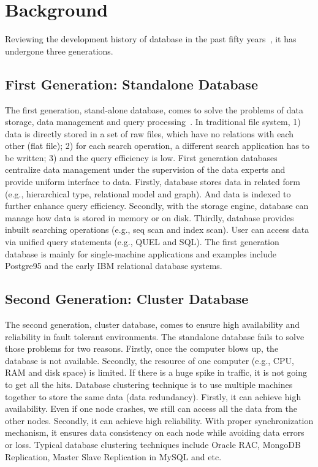 
\vspace{-.5em}
\section{Background}
\label{sec:background}
\vspace{-.25em}
Reviewing the development history of database in the past fifty years~\cite{Ramakrishnan:2002:DMS:560733}, it has undergone three generations.

\subsection{First Generation: Standalone Database}
The first generation, stand-alone database, comes to solve the problems of data storage, data management and query processing~\cite{DBLP:books/daglib/0006734}. In traditional file system, 1) data is directly stored in a set of raw files, which have no relations with each other (flat file); 2) for each search operation, a different search application has to be written; 3) and the query efficiency is low. First generation databases centralize data management under the supervision of the data experts and provide uniform interface to data. 
Firstly, database stores data in related form (e.g., hierarchical type, relational model and graph). And data is indexed to further enhance query efficiency. Secondly, with the storage engine, database can manage how data is stored in memory or on disk. Thirdly, database provides inbuilt searching operations (e.g., seq scan and index scan). User can access data via unified query statements (e.g., QUEL and SQL). The first generation database is mainly for single-machine applications and examples include Postgre95 and the early IBM relational database systems. 

\subsection{Second Generation: Cluster Database}
The second generation, cluster database, comes to ensure high availability and reliability in fault tolerant environments. The standalone database fails to solve those problems for two reasons. Firstly, once the computer blows up, the database is not available. Secondly, the resource of one computer (e.g., CPU, RAM and disk space) is limited. If there is a huge spike in traffic, it is not going to get all the hits. Database clustering technique is to use multiple machines together to store the same data (data redundancy). Firstly, it can achieve high availability. Even if one node crashes, we still can access all the data from the other nodes. Secondly, it can achieve high reliability. With proper synchronization mechanism, it ensures data consistency on each node while avoiding data errors or loss. Typical database clustering techniques include Oracle RAC, MongoDB Replication, Master Slave Replication in MySQL and etc.

